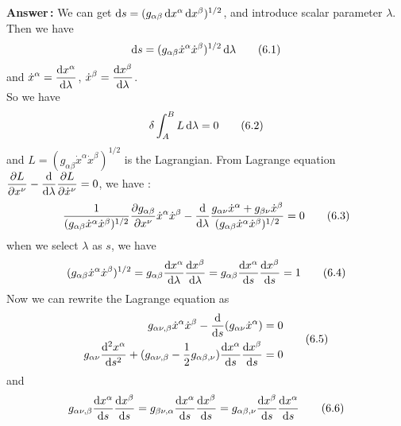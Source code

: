 \documentclass[12pt]{article}
\begin{document}
\textbf{Answer\,:} We can get $\mathop{}\!\mathrm{d} s=(g_{\alpha\beta}\mathop{}\!\mathrm{d} x^{\alpha}\mathop{}\!\mathrm{d} x^{\beta})^{1/2}$, and introduce scalar parameter $\lambda$.\\
Then we have
\begin{equation}
\displaystyle \mathop{}\!\mathrm{d} s=(g_{\alpha\beta}\dot x^{\alpha}\dot x^{\beta})^{1/2}\mathop{}\!\mathrm{d}\lambda
	\tag{6.1}
\end{equation}
and $\displaystyle \dot x^{\alpha}=\frac{\mathop{}\!\mathrm{d} x^{\alpha}}{\mathop{}\!\mathrm{d}\lambda}$, $\displaystyle \dot x^{\beta}=\frac{\mathop{}\!\mathrm{d} x^{\beta}}{\mathop{}\!\mathrm{d}\lambda}$.\\
So we have
\begin{equation}
\displaystyle 
\delta\int_{A}^{B}L\mathop{}\!\mathrm{d} \lambda=0
	\tag{6.2}
\end{equation}
and $L=(g_{\alpha\beta}\dot x^{\alpha}\dot x^{\beta})^{1/2}$ is the Lagrangian.
From Lagrange equation $\displaystyle \frac{\partial L}{\partial x^{\nu}}-\frac{\mathop{}\!\mathrm{d}}{\mathop{}\!\mathrm{d}\lambda}\frac{\partial L}{\partial\dot x^{\nu}}=0$, we have :
\begin{equation}
\displaystyle 
\frac{1}{(g_{\alpha\beta}\dot x^{\alpha}\dot x^{\beta})^{1/2}}\frac{\partial g_{\alpha\beta}}{\partial x^{\nu}}\dot x^{\alpha}\dot x^{\beta}-\frac{\mathop{}\!\mathrm{d}}{\mathop{}\!\mathrm{d}\lambda}\frac{g_{\alpha\nu}\dot x^{\alpha}+g_{\beta\nu}\dot x^{\beta}}{(g_{\alpha\beta}\dot x^{\alpha}\dot x^{\beta})^{1/2}}=0
	\tag{6.3}
\end{equation}
when we select	 $\lambda$ as $s$, we have
\begin{equation}
\displaystyle 
(g_{\alpha\beta}\dot x^{\alpha}\dot x^{\beta})^{1/2}=g_{\alpha\beta}\frac{\dif x^{\alpha}}{\dif\lambda}\frac{\dif x^{\beta}}{\dif\lambda}=g_{\alpha\beta}\frac{\dif x^{\alpha}}{\dif s}\frac{\dif x^{\beta}}{\dif s}=1
	\tag{6.4}
\end{equation}
Now we can rewrite the Lagrange equation as
\begin{equation}
\begin{aligned}
\displaystyle 
g_{\alpha\nu,\beta}\dot x^{\alpha}\dot x^{\beta}-\frac{\dif}{\dif s}(g_{\alpha\nu}\dot x^{\alpha})=0\\
g_{\alpha\nu}\frac{\dif^{2}x^{\alpha}}{\dif s^{2}}+(g_{\alpha\nu,\beta}-\frac{1}{2}g_{\alpha\beta,\nu})\frac{\dif x^{\alpha}}{\dif s}\frac{\dif x^{\beta}}{\dif s}=0
\end{aligned}
	\tag{6.5}
\end{equation}
and
\begin{equation}
\displaystyle 
g_{\alpha\nu,\beta}\frac{\dif x^{\alpha}}{\dif s}\frac{\dif x^{\beta}}{\dif s}=g_{\beta\nu,\alpha}\frac{\dif x^{\alpha}}{\dif s}\frac{\dif x^{\beta}}{\dif s}=g_{\alpha\beta,\nu}\frac{\dif x^{\beta}}{\dif s}\frac{\dif x^{\alpha}}{\dif s}
	\tag{6.6}
\end{equation}
\end{document}
